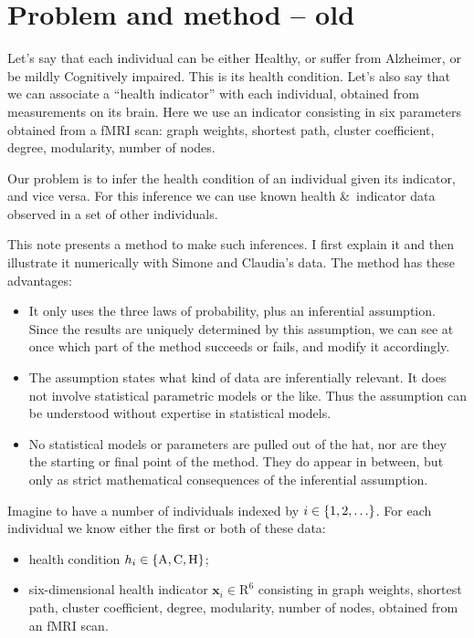 \documentclass[\ifafour a4paper,12pt,\else a5paper,10pt,\fi%
onecolumn,oneside,article,%
british%
]{memoir}
\theoremstyle{remark}
\theoremstyle{innote}
\newcommand*{\amp}{\&}
\newcommand*{\RR}{\bm{\mathrm{R}}}
\DeclarePairedDelimiter\set{\{}{\}}
\renewcommand*{\|}{\mathpunct{|}}
\newcommand*{\yH}{h}
\newcommand*{\yx}{x}
\newcommand*{\yxx}{\bm{\yx}}
\newcommand*{\ya}{\mathrm{A}}
\newcommand*{\yi}{\mathrm{C}}
\newcommand*{\yh}{\mathrm{H}}
\theoremstyle{plain}
\begin{document}
\section{Problem and method -- old}

Let's say that each individual can be either Healthy, or suffer from
Alzheimer, or be mildly Cognitively impaired. This is its health condition.
Let's also say that we can associate a \enquote{health indicator} with each
individual, obtained from measurements on its brain. Here we use an
indicator consisting in six parameters obtained from a fMRI scan: graph
weights, shortest path, cluster coefficient, degree, modularity, number of
nodes.

Our problem is to infer the health condition of an individual given its
indicator, and vice versa. For this inference we can use known health \amp\
indicator data observed in a set of other individuals.

This note presents a method to make such inferences. I first explain it and
then illustrate it numerically with Simone and Claudia's data. The method
has these advantages:
\begin{itemize}
\item It only uses the three laws of probability, plus an inferential
  assumption. Since the results are uniquely determined by this assumption,
  we can see at once which part of the method succeeds or fails, and
  modify it accordingly.
\item The assumption states what kind of data are inferentially relevant.
  It does not involve statistical parametric models or the like. Thus the
  assumption can be understood without expertise in statistical models.
\item No statistical models or parameters are pulled out of the hat, nor
  are they the starting or final point of the method. They do appear in
  between, but only as strict mathematical consequences of the inferential
  assumption.
\end{itemize}
  

\bigskip

Imagine to have a number of individuals indexed by $i\in\set{1,2,\dotsc}$.
For each individual we know either the first or both of these data:
\begin{itemize}
\item health condition $\yH_i \in \set{\ya, \yi, \yh}$;
\item six-dimensional health indicator $\yxx_i \in \RR^6$ consisting in
  graph weights, shortest path, cluster coefficient, degree, modularity,
  number of nodes, obtained from an fMRI scan.
\end{itemize}
\end{document}
